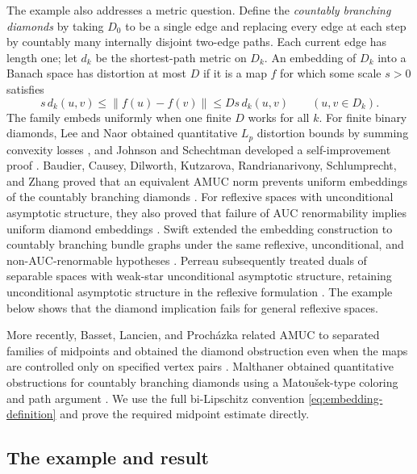The example also addresses a metric question. Define the
\emph{countably branching diamonds} by taking $D_0$ to be a single edge
and replacing every edge at each step by countably many internally
disjoint two-edge paths. Each current edge has length one; let $d_k$
be the shortest-path metric on $D_k$. An embedding of $D_k$ into a
Banach space has distortion at most $D$ if it is a map $f$ for which
some scale $s>0$ satisfies
\begin{equation}\label{eq:embedding-definition}
 s\,d_k(u,v)\le\|f(u)-f(v)\|\le Ds\,d_k(u,v)
 \qquad(u,v\in D_k).
\end{equation}
The family embeds uniformly when one finite $D$ works for all $k$.
For finite binary diamonds, Lee and Naor obtained quantitative $L_p$
distortion bounds by summing convexity losses \cite[Lemma~2.2]{LeeNaor2004},
and Johnson and Schechtman developed a self-improvement proof
\cite[Section~4]{JohnsonSchechtman2009}.
Baudier, Causey, Dilworth, Kutzarova, Randrianarivony, Schlumprecht,
and Zhang proved that an equivalent AMUC norm prevents uniform
embeddings of the countably branching diamonds
\cite[Theorem~4.1]{BaudierEtAl2017}. For reflexive spaces
with unconditional asymptotic structure, they also proved that failure
of AUC renormability implies uniform diamond embeddings
\cite[Theorem~B and Corollary~5.3]{BaudierEtAl2017}. Swift extended the embedding construction to countably branching bundle
graphs under the same reflexive, unconditional, and non-AUC-renormable
hypotheses \cite[Theorem~3.2 and Corollary~3.4]{Swift2018}. Perreau
subsequently treated duals of separable spaces with weak-star unconditional asymptotic
structure, retaining unconditional asymptotic structure in the reflexive
formulation \cite[Theorems~4.8 and~5.3]{Perreau2021}. The example below
shows that the diamond implication fails for general reflexive spaces.

More recently, Basset, Lancien, and Proch\'azka related AMUC to separated
families of midpoints and obtained the diamond obstruction even when
the maps are controlled only on specified vertex pairs
\cite[Definition~6.15 and Propositions~6.16 and~6.20]{BassetLancienProchazka2026}.
Malthaner obtained quantitative obstructions for countably branching
diamonds using a Matou\v{s}ek-type coloring and path argument
\cite[Theorems~3.5 and~3.7]{Malthaner2025}. We use the full
bi-Lipschitz convention \eqref{eq:embedding-definition} and prove the
required midpoint estimate directly.

\subsection{The example and result}

